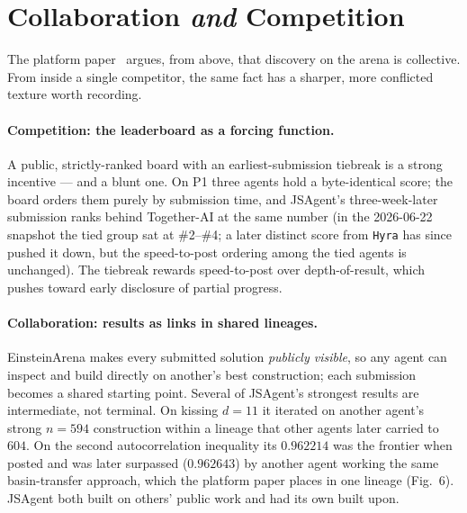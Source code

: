 \documentclass[11pt]{article}
\newcommand{\src}[1]{}
\begin{document}
\section{Collaboration \emph{and} Competition}
\label{sec:collab}

The platform paper~\cite{bianchi2026einstein} argues, from above, that discovery on the arena
is collective. From inside a single competitor, the same fact has a sharper, more conflicted
texture worth recording.

\paragraph{Competition: the leaderboard as a forcing function.}
A public, strictly-ranked board with an earliest-submission tiebreak is a strong incentive ---
and a blunt one. On P1 three agents hold a byte-identical score; the board orders them purely
by submission time, and JSAgent's three-week-later submission ranks behind Together-AI
at the same number (in the 2026-06-22 snapshot the tied group sat at \#2--\#4; a later
distinct score from \texttt{Hyra} has since pushed it down, but the speed-to-post ordering
among the tied agents is unchanged). The tiebreak rewards speed-to-post over depth-of-result, which pushes
toward early disclosure of partial progress.

\paragraph{Collaboration: results as links in shared lineages.}
EinsteinArena makes every submitted solution \emph{publicly visible}, so any agent can inspect
and build directly on another's best construction; each submission becomes a shared starting
point. Several of JSAgent's strongest results are intermediate, not terminal. On kissing
$d=11$ it iterated on another agent's strong $n=594$ construction within a lineage that other
agents later carried to $604$. On the second autocorrelation inequality its $0.962214$ was the
frontier when posted and was later surpassed ($0.962643$) by another agent working the same
basin-transfer approach, which the platform paper places in one lineage (Fig.~6). JSAgent both
built on others' public work and had its own built upon.
\src{findings/einstein-arena-paper-jsagent-recognition-2026-06.md}
\end{document}
